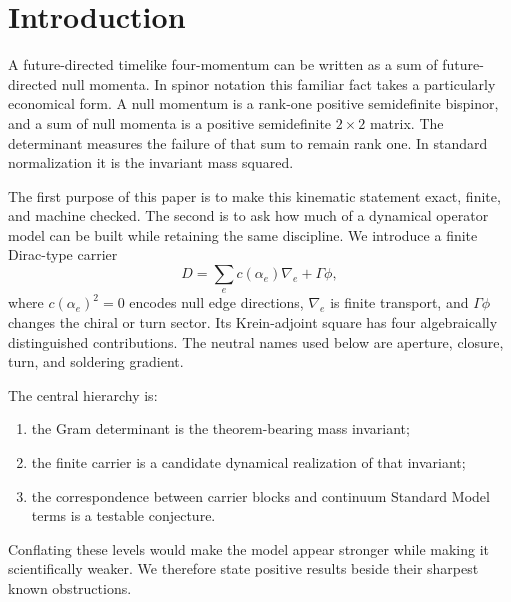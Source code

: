 \documentclass[11pt]{article}
\begin{document}
\section{Introduction}

A future-directed timelike four-momentum can be written as a sum of
future-directed null momenta.  In spinor notation this familiar fact takes a
particularly economical form.  A null momentum is a rank-one positive
semidefinite bispinor, and a sum of null momenta is a positive semidefinite
$2\times2$ matrix.  The determinant measures the failure of that sum to remain
rank one.  In standard normalization it is the invariant mass squared.

The first purpose of this paper is to make this kinematic statement exact,
finite, and machine checked.  The second is to ask how much of a dynamical
operator model can be built while retaining the same discipline.  We introduce
a finite Dirac-type carrier
\begin{equation}\label{eq:carrier}
  D=\sum_e c(\alpha_e)\nabla_e+\Gamma\phi,
\end{equation}
where $c(\alpha_e)^2=0$ encodes null edge directions, $\nabla_e$ is finite
transport, and $\Gamma\phi$ changes the chiral or turn sector.  Its
Krein-adjoint square has four algebraically distinguished contributions.  The
neutral names used below are aperture, closure, turn, and soldering gradient.

The central hierarchy is:
\begin{enumerate}[label=(\roman*)]
  \item the Gram determinant is the theorem-bearing mass invariant;
  \item the finite carrier is a candidate dynamical realization of that
        invariant;
  \item the correspondence between carrier blocks and continuum Standard Model
        terms is a testable conjecture.
\end{enumerate}
Conflating these levels would make the model appear stronger while making it
scientifically weaker.  We therefore state positive results beside their
sharpest known obstructions.
\end{document}
